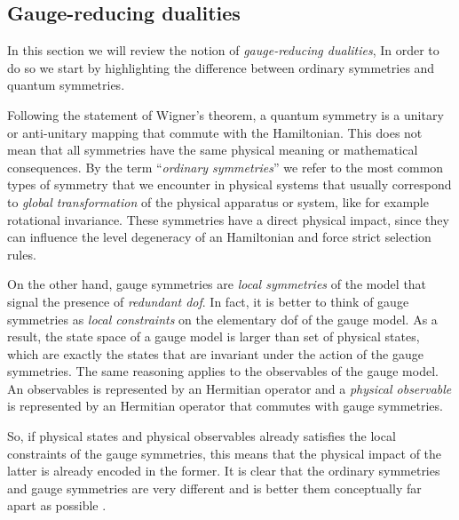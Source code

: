 \begin{figure}[t]
\end{figure}


%
%
\subsection{Gauge-reducing dualities}%
\label{sub:gauge_reducing_dualities}

In this section we will review the notion of \emph{gauge-reducing dualities},
In order to do so we start by highlighting the difference between ordinary symmetries and quantum symmetries.

Following the statement of Wigner's theorem\citneeded, a quantum symmetry is a unitary or anti-unitary mapping that commute with the Hamiltonian.
This does not mean that all symmetries have the same physical meaning or mathematical consequences.
By the term ``\emph{ordinary symmetries}'' we refer to the most common types of symmetry that we encounter in physical systems that usually correspond to \emph{global transformation} of the physical apparatus or system, like for example rotational invariance.
These symmetries have a direct physical impact, since they can influence the level degeneracy of an Hamiltonian and force strict selection rules.

On the other hand, gauge symmetries are \emph{local symmetries} of the model that signal the presence of \emph{redundant \ac{dof}}.
In fact, it is better to think of gauge symmetries as \emph{local constraints} on the elementary \ac{dof} of the gauge model.
As a result, the state space of a gauge model is larger than set of physical states, which are exactly the states that are invariant under the action of the gauge symmetries.
The same reasoning applies to the observables of the gauge model.
An observables is represented by an Hermitian operator and a \emph{physical observable} is represented by an Hermitian operator that commutes with gauge symmetries.

So, if physical states and physical observables already satisfies the local constraints of the gauge symmetries, this means that the physical impact of the latter is already encoded in the former.
It is clear that the ordinary symmetries and gauge symmetries are very different and is better them conceptually far apart as possible \cite{cobanera2011bond}.

